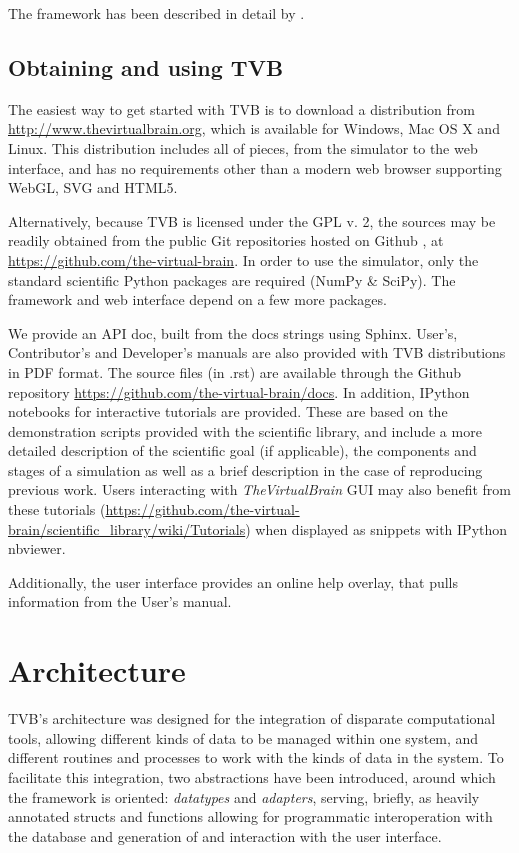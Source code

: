 \documentclass{bioinfo}
\newcommand{\TVB}{\textit{TheVirtualBrain }}
\begin{document}
The framework has been described in detail by \citeauthor{Sanz-Leon_2013}.

\subsection{Obtaining and using TVB}

The easiest way to get started with TVB is to download a distribution
from \url{http://www.thevirtualbrain.org}, which is available for Windows,
Mac OS X and Linux. This distribution includes
all of pieces, from the simulator to the web interface, and has no
requirements other than a modern web browser supporting WebGL, SVG and
HTML5.

Alternatively, because TVB is licensed under the GPL v. 2, the sources may be
readily obtained from the public Git repositories hosted on Github
\citep{dabbish2012social}, at 
\url{https://github.com/the-virtual-brain}. In order to use the simulator, 
only the standard scientific Python packages are required (NumPy \& SciPy).
The framework and web interface depend on a few more packages. 

We provide an API doc, built from the docs strings using Sphinx.
User's, Contributor's and Developer's manuals are also provided with TVB
distributions in PDF format. The source files (in .rst) are available
through the Github repository \url{https://github.com/the-virtual-brain/docs}.  
In addition, IPython notebooks \citep{PerezGranger_2007}
for interactive tutorials are provided. These are based on the
demonstration scripts provided with the scientific library, and
include a more detailed description of the scientific goal (if
applicable), the components and stages of a simulation as well as a
brief description in the case of reproducing previous work. Users
interacting with \TVB GUI may also benefit from these tutorials
(\url{https://github.com/the-virtual-
brain/scientific_library/wiki/Tutorials}) when displayed as snippets
with IPython nbviewer. 

Additionally, the user interface provides an online help overlay, that pulls
information from the User's manual.

\section{Architecture}

TVB's architecture was designed for the integration of disparate computational
tools, allowing different kinds of data to be managed within one system, and
different routines and processes to work with the kinds of data in the system.
To facilitate this integration, two abstractions have been introduced, around
which the framework is oriented: \textit{datatypes} and \textit{adapters},
serving, briefly, as heavily annotated structs and functions allowing for
programmatic interoperation with the database and generation of and interaction
with the user interface.
\end{document}
